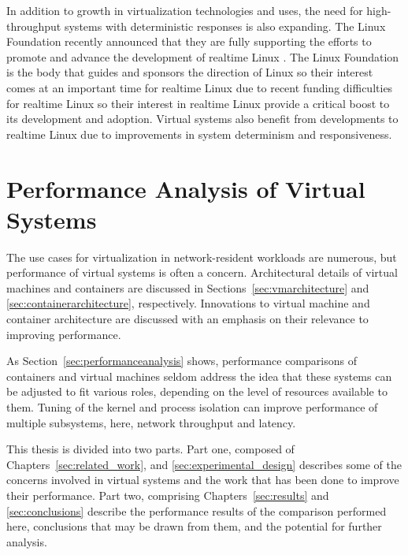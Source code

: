 In addition to growth in virtualization technologies and uses, the need for high-throughput systems with deterministic responses is also expanding.
The Linux Foundation recently announced that they are fully supporting the efforts to promote and advance the development of realtime Linux \autocite{_linux_foundation_1}.
The Linux Foundation is the body that guides and sponsors the direction of Linux so their interest comes at an important time for realtime Linux due to recent funding difficulties for realtime Linux \autocite{_lwn_1} so their interest in realtime Linux provide a critical boost to its development and adoption.
Virtual systems also benefit from developments to realtime Linux due to improvements in system determinism and responsiveness.

\section{Performance Analysis of Virtual Systems} %
\label{sec:introperformanceanalysis}
The use cases for virtualization in network-resident workloads are numerous, but performance of virtual systems is often a concern.
Architectural details of virtual machines and containers are discussed in Sections~\ref{sec:vmarchitecture} and \ref{sec:containerarchitecture}, respectively.  
Innovations to virtual machine and container architecture are discussed with an emphasis on their relevance to improving performance.

As Section~\ref{sec:performanceanalysis} shows, performance comparisons of containers and virtual machines seldom address the idea that these systems can be adjusted to fit various roles, depending on the level of resources available to them.  
Tuning of the kernel and process isolation can improve performance of multiple subsystems, here, network throughput and latency.  


This thesis is divided into two parts.
Part one, composed of Chapters~\ref{sec:related_work}, and \ref{sec:experimental_design} describes some of the concerns involved in virtual systems and the work that has been done to improve their performance.
Part two, comprising Chapters~\ref{sec:results} and \ref{sec:conclusions} describe the performance results of the comparison performed here, conclusions that may be drawn from them, and the potential for further analysis.
